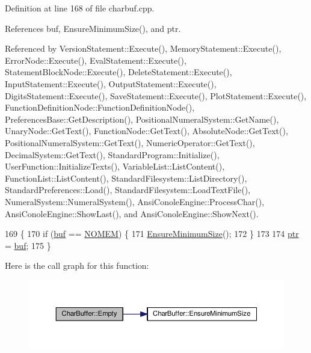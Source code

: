 Definition at line 168 of file charbuf.\+cpp.



References buf, Ensure\+Minimum\+Size(), and ptr.



Referenced by Version\+Statement\+::\+Execute(), Memory\+Statement\+::\+Execute(), Error\+Node\+::\+Execute(), Eval\+Statement\+::\+Execute(), Statement\+Block\+Node\+::\+Execute(), Delete\+Statement\+::\+Execute(), Input\+Statement\+::\+Execute(), Output\+Statement\+::\+Execute(), Digits\+Statement\+::\+Execute(), Save\+Statement\+::\+Execute(), Plot\+Statement\+::\+Execute(), Function\+Definition\+Node\+::\+Function\+Definition\+Node(), Preferences\+Base\+::\+Get\+Description(), Positional\+Numeral\+System\+::\+Get\+Name(), Unary\+Node\+::\+Get\+Text(), Function\+Node\+::\+Get\+Text(), Absolute\+Node\+::\+Get\+Text(), Positional\+Numeral\+System\+::\+Get\+Text(), Numeric\+Operator\+::\+Get\+Text(), Decimal\+System\+::\+Get\+Text(), Standard\+Program\+::\+Initialize(), User\+Function\+::\+Initialize\+Texts(), Variable\+List\+::\+List\+Content(), Function\+List\+::\+List\+Content(), Standard\+Filesystem\+::\+List\+Directory(), Standard\+Preferences\+::\+Load(), Standard\+Filesystem\+::\+Load\+Text\+File(), Numeral\+System\+::\+Numeral\+System(), Ansi\+Conole\+Engine\+::\+Process\+Char(), Ansi\+Conole\+Engine\+::\+Show\+Last(), and Ansi\+Conole\+Engine\+::\+Show\+Next().


\begin{DoxyCode}
169 \{
170     \textcolor{keywordflow}{if} (\hyperlink{classCharBuffer_a8bcd8491b24db4197b311eb361609674}{buf} == \hyperlink{platform_8h_a46ff2bfbf0d44b8466a2251d5bd5e6f8}{NOMEM}) \{
171         \hyperlink{classCharBuffer_ae742439a2d5d5a0ad64411dcbf4604c8}{EnsureMinimumSize}();
172     \}
173 
174     \hyperlink{classCharBuffer_a2d313433650506fd6609e6947729dfb0}{ptr} = \hyperlink{classCharBuffer_a8bcd8491b24db4197b311eb361609674}{buf};
175 \}
\end{DoxyCode}


Here is the call graph for this function\+:
\nopagebreak
\begin{figure}[H]
\begin{center}
\leavevmode
\includegraphics[width=350pt]{dc/d84/classCharBuffer_abe39d3fd7d8b9c8ec343af2cae7adc96_cgraph}
\end{center}
\end{figure}




